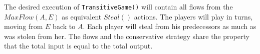 \begin{proofsketch}
   The desired execution of \texttt{TransitiveGame()} will contain all flows from the $MaxFlow\left(A, E\right)$ as
   equivalent $Steal\left(\right)$ actions. The players will play in turns, moving from $E$ back to $A$. Each player will
   steal from his predecessors as much as was stolen from her. The flows and the conservative strategy share the property
   that the total input is equal to the total output.
\end{proofsketch}
